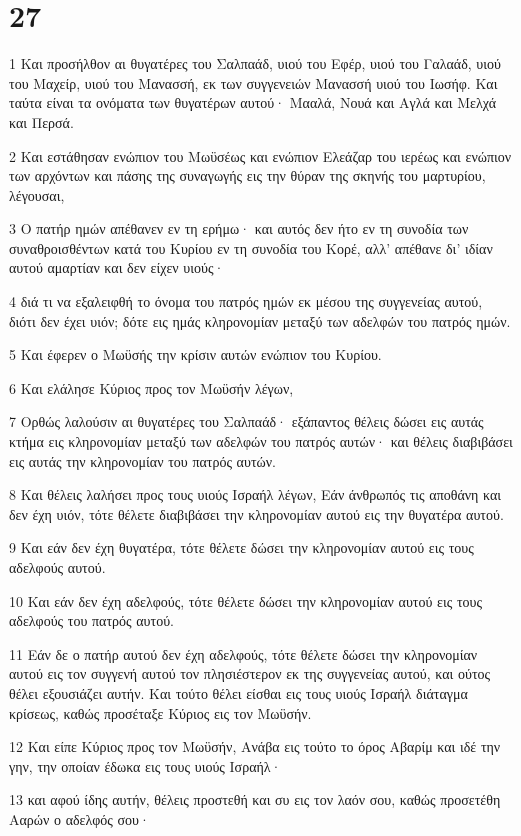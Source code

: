 \chapter{27}

\par 1 Και προσήλθον αι θυγατέρες του Σαλπαάδ, υιού του Εφέρ, υιού του Γαλαάδ, υιού του Μαχείρ, υιού του Μανασσή, εκ των συγγενειών Μανασσή υιού του Ιωσήφ. Και ταύτα είναι τα ονόματα των θυγατέρων αυτού· Μααλά, Νουά και Αγλά και Μελχά και Περσά.
\par 2 Και εστάθησαν ενώπιον του Μωϋσέως και ενώπιον Ελεάζαρ του ιερέως και ενώπιον των αρχόντων και πάσης της συναγωγής εις την θύραν της σκηνής του μαρτυρίου, λέγουσαι,
\par 3 Ο πατήρ ημών απέθανεν εν τη ερήμω· και αυτός δεν ήτο εν τη συνοδία των συναθροισθέντων κατά του Κυρίου εν τη συνοδία του Κορέ, αλλ' απέθανε δι' ιδίαν αυτού αμαρτίαν και δεν είχεν υιούς·
\par 4 διά τι να εξαλειφθή το όνομα του πατρός ημών εκ μέσου της συγγενείας αυτού, διότι δεν έχει υιόν; δότε εις ημάς κληρονομίαν μεταξύ των αδελφών του πατρός ημών.
\par 5 Και έφερεν ο Μωϋσής την κρίσιν αυτών ενώπιον του Κυρίου.
\par 6 Και ελάλησε Κύριος προς τον Μωϋσήν λέγων,
\par 7 Ορθώς λαλούσιν αι θυγατέρες του Σαλπαάδ· εξάπαντος θέλεις δώσει εις αυτάς κτήμα εις κληρονομίαν μεταξύ των αδελφών του πατρός αυτών· και θέλεις διαβιβάσει εις αυτάς την κληρονομίαν του πατρός αυτών.
\par 8 Και θέλεις λαλήσει προς τους υιούς Ισραήλ λέγων, Εάν άνθρωπός τις αποθάνη και δεν έχη υιόν, τότε θέλετε διαβιβάσει την κληρονομίαν αυτού εις την θυγατέρα αυτού.
\par 9 Και εάν δεν έχη θυγατέρα, τότε θέλετε δώσει την κληρονομίαν αυτού εις τους αδελφούς αυτού.
\par 10 Και εάν δεν έχη αδελφούς, τότε θέλετε δώσει την κληρονομίαν αυτού εις τους αδελφούς του πατρός αυτού.
\par 11 Εάν δε ο πατήρ αυτού δεν έχη αδελφούς, τότε θέλετε δώσει την κληρονομίαν αυτού εις τον συγγενή αυτού τον πλησιέστερον εκ της συγγενείας αυτού, και ούτος θέλει εξουσιάζει αυτήν. Και τούτο θέλει είσθαι εις τους υιούς Ισραήλ διάταγμα κρίσεως, καθώς προσέταξε Κύριος εις τον Μωϋσήν.
\par 12 Και είπε Κύριος προς τον Μωϋσήν, Ανάβα εις τούτο το όρος Αβαρίμ και ιδέ την γην, την οποίαν έδωκα εις τους υιούς Ισραήλ·
\par 13 και αφού ίδης αυτήν, θέλεις προστεθή και συ εις τον λαόν σου, καθώς προσετέθη Ααρών ο αδελφός σου·
